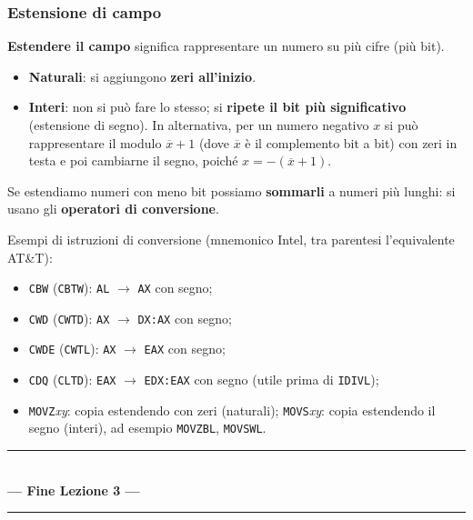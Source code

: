 \documentclass[11pt,a4paper]{article}
\begin{document}
\subsubsection*{Estensione di campo}

\textbf{Estendere il campo} significa rappresentare un numero su più cifre (più bit).

\begin{itemize}[leftmargin=*]
  \item \textbf{Naturali}: si aggiungono \textbf{zeri all'inizio}.
  \item \textbf{Interi}: non si può fare lo stesso; si \textbf{ripete il bit più significativo} (estensione di segno). In alternativa, per un numero negativo $x$ si può rappresentare il modulo $\overline{x}+1$ (dove $\overline{x}$ è il complemento bit a bit) con zeri in testa e poi cambiarne il segno, poiché $x = -(\overline{x}+1)$.
\end{itemize}

Se estendiamo numeri con meno bit possiamo \textbf{sommarli} a numeri più lunghi: si usano gli \textbf{operatori di conversione}.

\begin{integrazione}
Esempi di istruzioni di conversione (mnemonico Intel, tra parentesi l'equivalente AT\&T):
\begin{itemize}[leftmargin=*]
  \item \texttt{CBW} (\texttt{CBTW}): \texttt{AL} $\to$ \texttt{AX} con segno;
  \item \texttt{CWD} (\texttt{CWTD}): \texttt{AX} $\to$ \texttt{DX:AX} con segno;
  \item \texttt{CWDE} (\texttt{CWTL}): \texttt{AX} $\to$ \texttt{EAX} con segno;
  \item \texttt{CDQ} (\texttt{CLTD}): \texttt{EAX} $\to$ \texttt{EDX:EAX} con segno (utile prima di \texttt{IDIVL});
  \item \texttt{MOVZ}\emph{xy}: copia estendendo con zeri (naturali); \texttt{MOVS}\emph{xy}: copia estendendo il segno (interi), ad esempio \texttt{MOVZBL}, \texttt{MOVSWL}.
\end{itemize}
\end{integrazione}

	\vspace{1.5cm}
	\begin{center}
		\rule{0.65\textwidth}{1pt} \\
		\vspace{0.4cm}
		\textcolor{titlecolor}{\LARGE \textbf{--- Fine Lezione 3 ---}} \\
		\vspace{0.2cm}
		\rule{0.65\textwidth}{1pt}
	\end{center}
	\newpage
\end{document}
